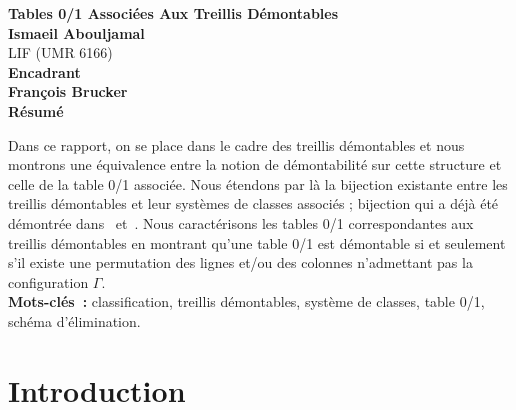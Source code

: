 \documentclass[a4paper]{report}
\renewcommand{\textbf}[1]{\begingroup\bfseries\mathversion{bold}#1\endgroup}
\begin{document}


\def\TitreRapport{
Tables 0/1 Associées Aux Treillis Démontables
}


\def\NomsAuteurs{
Ismaeil Abouljamal
}

\def\DateRapport{
    10 juin 2011
}

\def\Encadrants{
    \textbf{Encadrant} \\
    François Brucker
}
\def\Labo{
    LIF (UMR 6166)
}



\def\ResumeFrancais{
Dans ce rapport, on se place dans le cadre des treillis démontables et nous montrons une équivalence entre la notion de démontabilité sur cette structure et celle
de la table 0/1 associée.
Nous étendons par là la bijection existante entre les treillis démontables et leur systèmes de classes associés ; bijection qui a déjà été démontrée dans~\cite{par_clu} et~\cite{crow_free}.
Nous caractérisons les tables 0/1 correspondantes aux treillis démontables en montrant qu'une table 0/1 est démontable si et seulement s'il existe une permutation 
des lignes et/ou des colonnes n'admettant pas la configuration $\Gamma$. 
    \\[2mm]
    {\bf Mots-clés~: }classification, treillis démontables, système de classes, table 0/1, schéma d'élimination.
}


\thispagestyle{empty}
\begin{center}
\normalbaselineskip
{\bf\Large \TitreRapport}\\[8mm]
{\bf\large \NomsAuteurs}\\[1mm]
{\Labo}\\[4mm]
\Encadrants\\[10mm]

{\bf Résumé}
\end{center}
\ResumeFrancais\\[4mm]

\tableofcontents


\chapter*{Introduction}
\end{document}
